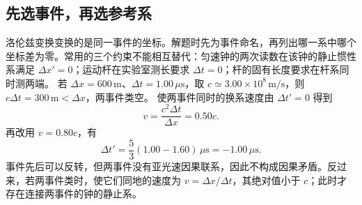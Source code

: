 \subsection{先选事件，再选参考系}
洛伦兹变换变换的是同一事件的坐标。解题时先为事件命名，再列出哪一系中哪个坐标差为零。常用的三个约束不能相互替代：匀速钟的两次读数在该钟的静止惯性系满足 $\Delta x'=0$；运动杆在实验室测长要求 $\Delta t=0$；杆的固有长度要求在杆系同时测两端。
若 $\Delta x=600\,\mathrm m$、$\Delta t=1.00\,\mu\mathrm s$，取 $c\simeq3.00\times10^8\,\mathrm{m/s}$，则 $c\Delta t=300\,\mathrm m<\Delta x$，两事件类空。
使两事件同时的换系速度由 $\Delta t'=0$ 得到
\[
 v=\frac{c^2\Delta t}{\Delta x}=0.50c.
\]
再改用 $v=0.80c$，有
\[
 \Delta t'=\frac53(1.00-1.60)\,\mu\mathrm s=-1.00\,\mu\mathrm s.
\]
事件先后可以反转，但两事件没有亚光速因果联系，因此不构成因果矛盾。反过来，若两事件类时，使它们同地的速度为 $v=\Delta x/\Delta t$，其绝对值小于 $c$；此时才存在连接两事件的钟的静止系。
